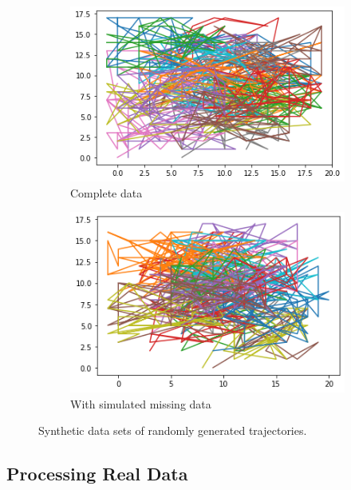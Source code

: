 \begin{figure}
    \centering
    \begin{subfigure}{.45\textwidth}
        \centering
        \includegraphics[width=\textwidth]{figures/SYNTHETHIC_COMPLETE.png}
        \caption{Complete data}
        \label{sfig:synthetic-comp}
    \end{subfigure}
    \hfill
    \begin{subfigure}{.45\textwidth}
        \centering
        \includegraphics[width=\textwidth]{figures/SYNTHETHIC_MISSING.png}
        \caption{With simulated missing data}
        \label{sfig:synthetic-missing}
    \end{subfigure}
    \caption{Synthetic data sets of randomly generated trajectories.}
    \label{fig:synthetic-datasets}
\end{figure}

\subsection{Processing Real Data}


